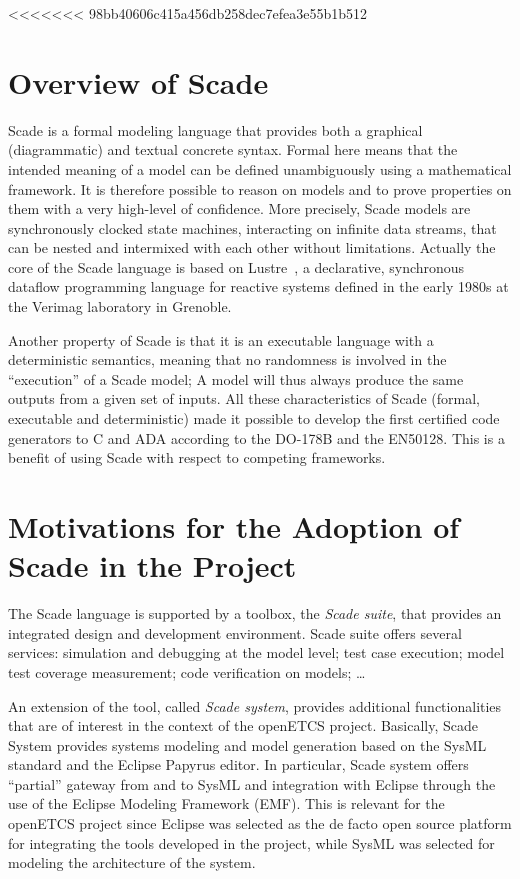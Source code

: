 \documentclass{template/openetcs_report}
\begin{document}
<<<<<<< 98bb40606c415a456db258dec7efea3e55b1b512
\section{Overview of Scade}

Scade is a formal modeling language that provides both a graphical
(diagrammatic) and textual concrete syntax. Formal here means that the
intended meaning of a model can be defined unambiguously using a
mathematical framework. It is therefore possible to reason on models
and to prove properties on them with a very high-level of
confidence. More precisely, Scade models are synchronously clocked
state machines, interacting on infinite data streams, that can be
nested and intermixed with each other without limitations. Actually
the core of the Scade language is based on
Lustre~\cite{al91,halbwachs05}, a declarative, synchronous dataflow
programming language for reactive systems defined in the early 1980s
at the Verimag laboratory in Grenoble.

Another property of Scade is that it is an executable language with a
deterministic semantics, meaning that no randomness is involved in the
``execution'' of a Scade model; A model will thus always produce the
same outputs from a given set of inputs.  All these characteristics of
Scade (formal, executable and deterministic) made it possible to
develop the first certified code generators to C and ADA according to
the DO-178B and the EN50128. This is a benefit of using Scade with
respect to competing frameworks.


\section{Motivations for the Adoption of Scade in the Project}

The Scade language is supported by a toolbox, the \emph{Scade suite},
that provides an integrated design and development environment. Scade
suite offers several services: simulation and debugging at the model
level; test case execution; model test coverage measurement; code
verification on models; \dots 

An extension of the tool, called \emph{Scade system}, provides
additional functionalities that are of interest in the context of the
openETCS project. Basically, Scade System provides systems modeling
and model generation based on the SysML standard and the Eclipse
Papyrus editor. In particular, Scade system offers ``partial'' gateway
from and to SysML and integration with Eclipse through the use of the
Eclipse Modeling Framework (EMF). This is relevant for the openETCS
project since Eclipse was selected as the de facto open source
platform for integrating the tools developed in the project, while
SysML was selected for modeling the architecture of the
system. 
\end{document}
